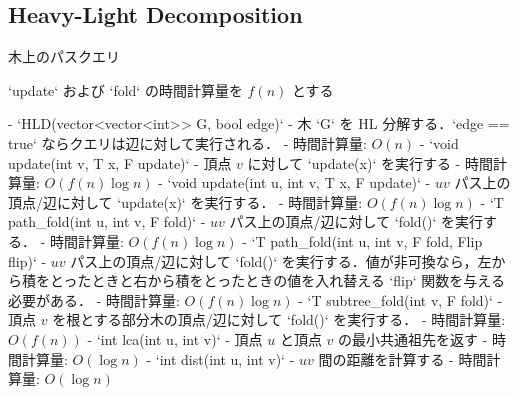 \subsection{Heavy-Light Decomposition}

\begin{small}
\begin{markdown}
木上のパスクエリ

`update` および `fold` の時間計算量を $f(n)$ とする

- `HLD(vector<vector<int>> G, bool edge)`
    - 木 `G` を HL 分解する．`edge == true` ならクエリは辺に対して実行される．
    - 時間計算量: $O(n)$
- `void update(int v, T x, F update)`
    - 頂点 $v$ に対して `update(x)` を実行する
    - 時間計算量: $O(f(n) \log n)$
- `void update(int u, int v, T x, F update)`
    - $uv$ パス上の頂点/辺に対して `update(x)` を実行する．
    - 時間計算量: $O(f(n) \log n)$
- `T path\_fold(int u, int v, F fold)`
    - $uv$ パス上の頂点/辺に対して `fold()` を実行する．
    - 時間計算量: $O(f(n) \log n)$
- `T path\_fold(int u, int v, F fold, Flip flip)`
    - $uv$ パス上の頂点/辺に対して `fold()` を実行する．値が非可換なら，左から積をとったときと右から積をとったときの値を入れ替える `flip` 関数を与える必要がある．
    - 時間計算量: $O(f(n) \log n)$
- `T subtree\_fold(int v, F fold)`
    - 頂点 $v$ を根とする部分木の頂点/辺に対して `fold()` を実行する．
    - 時間計算量: $O(f(n))$
- `int lca(int u, int v)`
    - 頂点 $u$ と頂点 $v$ の最小共通祖先を返す
    - 時間計算量: $O(\log n)$
- `int dist(int u, int v)`
    - $uv$ 間の距離を計算する
    - 時間計算量: $O(\log n)$

\end{markdown}
\end{small}

